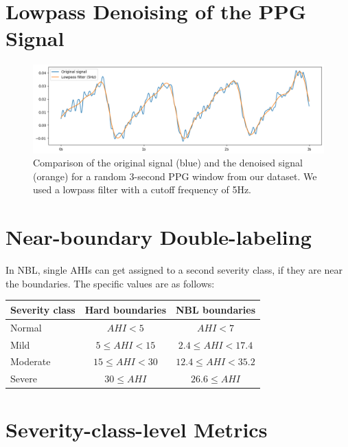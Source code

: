 \section{Lowpass Denoising of the PPG Signal\label{Apx-Denoise}}

\begin{figure}[h!]
    \centering
    \includegraphics[width=\textwidth]{images/Lowpass}
    \caption{Comparison of the original signal (blue) and the denoised signal (orange) for a random 3-second PPG window from our dataset. We used a lowpass filter with a cutoff frequency of 5Hz.}
    \label{fig:lowpass-example}
\end{figure}

\section{Near-boundary Double-labeling\label{Apx-NBL}}

In NBL, single AHIs can get assigned to a second severity class, if they are near the boundaries. The specific values are as follows:

\renewcommand{\arraystretch}{1.5}
\begin{table}[h!]
    \centering
    \begin{tabular}{ l c c }
        Severity class & Hard boundaries & NBL boundaries \\
        \hline
        Normal   & $ AHI < 5 $         & $ AHI < 7 $             \\
        Mild     & $ 5 \le AHI < 15 $  & $ 2.4 \le AHI < 17.4 $  \\
        Moderate & $ 15 \le AHI < 30 $ & $ 12.4 \le AHI < 35.2 $ \\
        Severe   & $ 30 \le AHI $      & $ 26.6 \le AHI $        \\
    \end{tabular}
\end{table}

\section{Severity-class-level Metrics\label{Apx-Severity-Metrics}}

